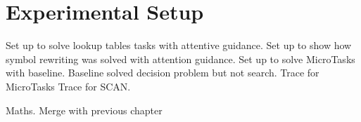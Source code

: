 \chapter{Experimental Setup}
Set up to solve lookup tables tasks with attentive guidance.
Set up to show how symbol rewriting was solved with attention guidance.
Set up to solve MicroTasks with baseline. Baseline solved decision problem but not search.
Trace for MicroTasks
Trace for SCAN.


Maths. Merge with previous chapter